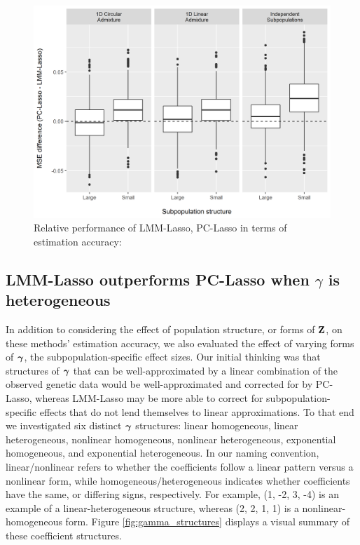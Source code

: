 \begin{figure}[H]
    \centering
     \includegraphics[scale = 0.9]{figures/mse_diff_subpops.png}
    \caption{Relative performance of LMM-Lasso, PC-Lasso in terms of estimation accuracy:  }
    \label{fig:big_vs_small}
\end{figure}


\subsection{LMM-Lasso outperforms PC-Lasso when $\gamma$ is heterogeneous}

In addition to considering the effect of population structure, or forms of $\textbf{Z}$, on these methods' estimation accuracy, we also evaluated the effect of varying forms of $\boldsymbol{\gamma}$, the subpopulation-specific effect sizes. Our initial thinking was that structures of $\boldsymbol{\gamma}$ that can be well-approximated by a linear combination of the observed genetic data would be well-approximated and corrected for by PC-Lasso, whereas LMM-Lasso may be more able to correct for subpopulation-specific effects that do not lend themselves to linear approximations. To that end we investigated six distinct $\boldsymbol{\gamma}$ structures: linear homogeneous, linear heterogeneous, nonlinear homogeneous, nonlinear heterogeneous, exponential homogeneous, and exponential heterogeneous. In our naming convention, linear/nonlinear refers to whether the coefficients follow a linear pattern versus a nonlinear form, while homogeneous/heterogeneous indicates whether coefficients have the same, or differing signs, respectively. For example, (1, -2, 3, -4) is an example of a linear-heterogeneous structure, whereas (2, 2, 1, 1) is a nonlinear-homogeneous form. Figure \ref{fig:gamma_structures} displays a visual summary of these coefficient structures. \\

